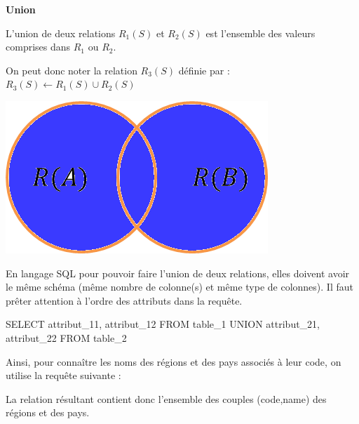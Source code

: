\documentclass[10pt]{article}
\newif\ifprofvar
\begin{document}
\begin{defi}
\begin{minipage}[c]{.75\linewidth}
\textbf{Union}

L'union de deux relations $R_1(S)$ et $R_2(S)$ est l'ensemble des valeurs comprises dans $R_1$ ou $R_2$. 

On peut donc noter la relation $R_3(S)$ définie par : $R_3(S)\leftarrow R_1(S)\cup R_2(S)$
\end{minipage}\hfill
\begin{minipage}[c]{.2\linewidth}
\begin{center}
\includegraphics[width=.95\textwidth]{images/union}
\end{center}
\end{minipage}

\end{defi}

\begin{envsql}
En langage SQL pour pouvoir faire l'union de deux relations, elles doivent avoir le même schéma (même nombre de colonne(s) et même type de colonnes). Il faut prêter attention à l'ordre des attributs dans la requête. 

\begin{sql}
SELECT  attribut_11, attribut_12 FROM table_1 UNION attribut_21, attribut_22 FROM table_2
\end{sql}
\end{envsql}

\begin{exemple}
Ainsi, pour connaître les noms des régions et des pays associés à leur code, on utilise la requête suivante :

\ifprofvar
\begin{envsql}
\begin{sql}
SELECT code,name FROM Countries UNION SELECT code,name FROM Regions;
\end{sql}
\end{envsql}
\else
\vspace{3cm}
\fi

La relation résultant contient donc l'ensemble des couples (code,name) des régions et des  pays. 
\end{exemple}
\end{document}

